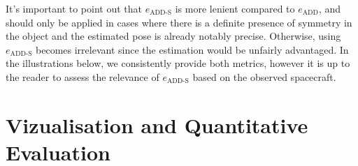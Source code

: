 It's important to point out that $e_{\mathrm{ADD}\text{-}\mathrm{S}}$ is more lenient compared to $e_\mathrm{ADD}$, and should only be applied in cases where there is a definite presence of symmetry in the object and the estimated pose is already notably precise. Otherwise, using $e_{\mathrm{ADD}\text{-}\mathrm{S}}$ becomes irrelevant since the estimation would be unfairly advantaged. In the illustrations below, we consistently provide both metrics, however it is up to the reader to assess the relevance of $e_{\mathrm{ADD}\text{-}\mathrm{S}}$ based on the observed spacecraft. 


\section{Vizualisation and Quantitative Evaluation}

